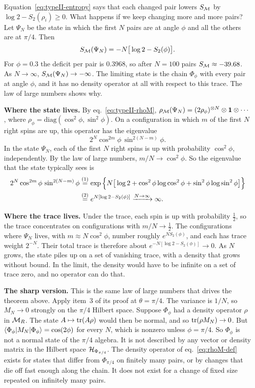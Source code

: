 Equation~\eqref{eq:typeII-entropy} says that each changed pair lowers $S_{\mathcal{M}}$ by $\log2-S_2(\rho_i)\ge0$. What
happens if we keep changing more and more pairs? Let $\Psi_N$ be the state in which the first $N$ pairs are at
angle $\phi$ and all the others are at $\pi/4$. Then
\[
S_{\mathcal{M}}(\Psi_N) = -N\big[\log2-S_2(\phi)\big] .
\]
For $\phi=0.3$ the deficit per pair is $0.3968$, so after $N=100$ pairs $S_{\mathcal{M}}\approx-39.68$. As $N\to\infty$,
$S_{\mathcal{M}}(\Psi_N)\to-\infty$. The limiting state is the chain $\Phi_\phi$ with every pair at angle $\phi$, and it
has no density operator at all with respect to this trace. The law of large numbers shows why.

\textbf{Where the state lives.} By eq.~\eqref{eq:typeII-rhoM}, $\rho_{\mathcal{M}}(\Psi_N)=(2\rho_\phi)^{\otimes
N}\otimes\mathbf{1}\otimes\cdots$, where $\rho_\phi=\mathrm{diag}(\cos^2\phi,\sin^2\phi)$. On a configuration in which
$m$ of the first $N$ right spins are up, this operator has the eigenvalue
\[
2^N\cos^{2m}\phi\,\sin^{2(N-m)}\phi .
\]
In the state $\Psi_N$, each of the first $N$ right spins is up with probability $\cos^2\phi$, independently. By
the law of large numbers, $m/N\to\cos^2\phi$. So the eigenvalue that the state typically sees is
\begin{align}
2^N\cos^{2m}\phi\,\sin^{2(N-m)}\phi
&\overset{(1)}{=} \exp\Big\{N\big[\log2+\cos^2\phi\log\cos^2\phi+\sin^2\phi\log\sin^2\phi\big]\Big\} \notag\\
&\overset{(2)}{=} e^{N[\log2-S_2(\phi)]} \xrightarrow{N\to\infty}\infty . \notag
\end{align}
\quad
{}

\textbf{Where the trace lives.} Under the trace, each spin is up with probability $\tfrac12$, so the trace
concentrates on configurations with $m/N\to\tfrac12$. The configurations where $\Psi_N$ lives, with $m\approx
N\cos^2\phi$, number roughly $e^{NS_2(\phi)}$, and each has trace weight $2^{-N}$. Their total trace is
therefore about $e^{-N[\log2-S_2(\phi)]}\to0$. As $N$ grows, the state piles up on a set of vanishing trace,
with a density that grows without bound. In the limit, the density would have to be infinite on a set of trace
zero, and no operator can do that.

\textbf{The sharp version.} This is the same law of large numbers that drives the theorem above. Apply item~3
of its proof at $\theta=\pi/4$. The variance is $1/N$, so $M_N\to0$ strongly on the $\pi/4$ Hilbert space.
Suppose $\Phi_\phi$ had a density operator $\rho$ in $\mathcal{M}_R$. The state $A\mapsto\operatorname{tr}(A\rho)$ would then be
normal, and so $\operatorname{tr}(\rho M_N)\to0$. But $\braket{\Phi_\phi|M_N|\Phi_\phi}=\cos(2\phi)$ for every $N$, which is
nonzero unless $\phi=\pi/4$. So $\Phi_\phi$ is not a normal state of the $\pi/4$ algebra. It is not described by
any vector or density matrix in the Hilbert space $\mathcal{H}_{\Phi_{\pi/4}}$. The density operator of
eq.~\eqref{eq:rhoM-def} exists for states that differ from $\Phi_{\pi/4}$ on finitely many pairs, or by
changes that die off fast enough along the chain. It does not exist for a change of fixed size repeated on
infinitely many pairs.

